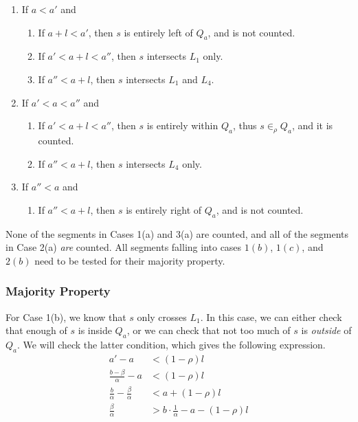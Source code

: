 \begin{enumerate}
 \item If $a < a'$ and

 \begin{enumerate}
  \item If $a + l < a'$, then $s$ is entirely left of $Q_a$, and is not counted.
  \item If $a' < a + l < a''$, then $s$ intersects $L_1$ only.
  \item If $a'' < a + l$, then $s$ intersects $L_1$ and $L_4$.
 \end{enumerate}

 \item If $a' < a < a''$ and
 \begin{enumerate}
  \item If $a' < a + l < a''$, then $s$ is entirely within $Q_a$, thus $s \in_\rho Q_a$, and it is counted.
  \item If $a'' < a + l$, then $s$ intersects $L_4$ only.
 \end{enumerate}

 \item If $a'' < a$ and
 \begin{enumerate}
  \item If $a'' < a + l$, then $s$ is entirely right of $Q_a$, and is not counted.
 \end{enumerate}
\end{enumerate}

None of the segments in Cases 1(a) and 3(a) are counted, and all of the segments in Case 2(a) \emph{are} counted. All segments falling into cases $1(b)$, $1(c)$, and $2(b)$ need to be tested for their majority property.


\subsubsection{Majority Property}

For Case 1(b), we know that $s$ only crosses $L_1$. In this case, we can either check that enough of $s$ is inside $Q_a$, or we can check that not too much of $s$ is \emph{outside} of $Q_a$.  We will check the latter condition, which gives the following expression.
\[
\begin{split}
a' - a &< (1 - \rho)l \\
%
\frac{b - \beta}{\alpha} - a &< (1 - \rho)l \\
%
\frac{b}{\alpha} - \frac{\beta}{\alpha} &< a + (1 - \rho)l \\
%
\frac{\beta}{\alpha} &> b\cdot \frac{1}{\alpha} - a - (1-\rho)l
%
\end{split}
\]

